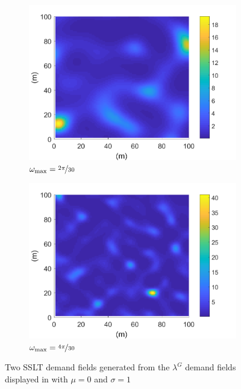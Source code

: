 \documentclass[12pt,dvipsnames]{report}
\begin{document}
\begin{figure}[ht]
	\centering
	\begin{subfigure}{.49\textwidth}
		\centering
		\includegraphics[width=1\linewidth]{lambda_O2pi-300_L100000_X100_Y100}
		\caption{\small $\omega_{\max}=\nicefrac{2 \pi}{30}$}
		\label{fig:lambda_2pi-300}
	\end{subfigure} \hfill
	\begin{subfigure}{.49\textwidth}
		\centering
		\includegraphics[width=1\linewidth]{lambda_O4pi-300_L100000_X100_Y100}
		\caption{\small $\omega_{\max}=\nicefrac{4 \pi}{30}$}
		\label{fig:lambda_4pi-300}
	\end{subfigure}
	\caption[Generated example SSLT demand fields]{\small Two SSLT demand fields generated from the $\lambda^G$ demand fields displayed in  with $\mu = 0$ and $\sigma = 1$}
	\label{fig:lambda}
\end{figure}
\end{document}
